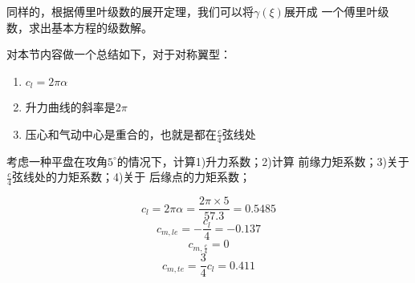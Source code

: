 同样的，根据傅里叶级数的展开定理，我们可以将$\gamma(\xi)$展开成
一个傅里叶级数，求出基本方程的级数解。

对本节内容做一个总结如下，对于对称翼型：
\begin{enumerate}
  \item $c_l=2\pi \alpha$ 
  \item 升力曲线的斜率是$2\pi$
  \item 压心和气动中心是重合的，也就是都在$\frac{c}{4}$弦线处
\end{enumerate}
\begin{example}
  考虑一种平盘在攻角$5^\circ$的情况下，计算1)升力系数；2)计算
  前缘力矩系数；3)关于$\frac{c}{4}$弦线处的力矩系数；4)关于
  后缘点的力矩系数；

  \[
    c_l=2 \pi \alpha=\frac{2\pi\times 5}{57.3}=0.5485
  \]
\[
c_{m,le}=- \frac{c_l}{4}=-0.137
\]
\[
  c_{m,\frac{c}{4}}=0
\]
\[
  c_{m,te}=\frac{3}{4}c_l=0.411
\]
\end{example}





